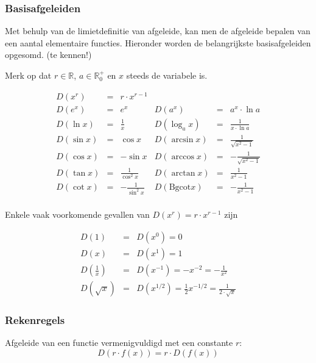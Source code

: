 \subsubsection{Basisafgeleiden}

Met behulp van de limietdefinitie van afgeleide, kan men de afgeleide bepalen van een aantal elementaire functies. Hieronder worden de belangrijkste basisafgeleiden opgesomd. (te kennen!)

Merk op dat $r \in \mathbb{R}$, $a \in \mathbb{R}^+_0$ en $x$ steeds de variabele is.

\begin{equation*}
\begin{array}{rclrcl}
D(x^r)&=&r\cdot x^{r-1} & & &  \\
D(e^x)&=&e^x& D(a^x)&=&a^x\cdot \ln a \\
D(\ln x)&=&\frac{1}{x}&D(\log_{a}x)&=&\frac{1}{x\cdot \ln a} \\
D(\sin x)&=&\cos x  & D(\arcsin x) &=& \frac{1}{\sqrt{x^2-1}} \\
D(\cos x)&=&-\sin x  & D(\arccos x) &=& -\frac{1}{\sqrt{x^2-1}} \\
D(\tan x)&=&\frac{1}{\cos^2 x} & D(\arctan x) &=& \frac{1}{x^2-1} \\
D(\cot x)&=&-\frac{1}{\sin^2 x} & D(\text{Bgcot} x) &=& -\frac{1}{x^2-1} \\
\end{array}
\end{equation*}

Enkele vaak voorkomende gevallen van $D(x^r)=r\cdot x^{r-1}$ zijn

\begin{eqnarray*}
D(1) &=& D(x^0) = 0 \\
D(x) &=& D(x^1) = 1 \\
D(\frac{1}{x})&=&D(x^{-1})=-x^{-2}=-\frac{1}{x^2}\\
D(\sqrt{x})&=&D(x^{1/2})=\frac{1}{2}x^{-1/2}=\frac{1}{2 \cdot \sqrt{x}}
\end{eqnarray*}

\subsubsection{Rekenregels}

\begin{ftrekenregel}
	Afgeleide van een functie vermenigvuldigd met een constante $r$:
	\begin{equation*}
	D(r \cdot f(x)) = r \cdot D(f(x))
	\end{equation*}
\end{ftrekenregel}


